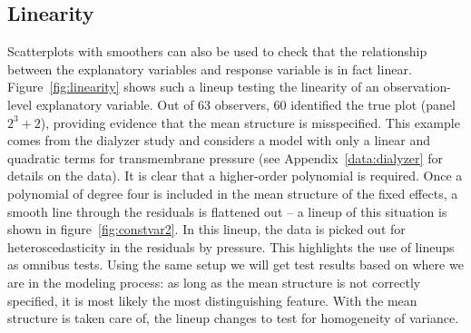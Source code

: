 \documentclass[12pt]{article} %
\newcommand{\alnote}[1]{\todo[inline,color=green!40]{#1}} %
\newcommand{\hhnote}[1]{\todo[inline,color=orange!40]{#1}}
\begin{document}




\subsection{Linearity}

Scatterplots with smoothers can also be used to check that the relationship between the explanatory variables and response variable is in fact linear. Figure~\ref{fig:linearity} shows such a lineup testing the linearity of an observation-level explanatory variable. Out of 63 observers, 60 identified the true plot (panel $2^3 + 2$), providing evidence that the mean structure is misspecified. This example comes from the dialyzer study and considers a model with only a linear and quadratic terms for transmembrane pressure (see Appendix~\ref{data:dialyzer} for details on the data). It is clear that a higher-order polynomial is required. 
Once a polynomial of degree four is included in the mean structure of the fixed effects, a smooth line through the residuals is flattened out -- a lineup of this situation is shown in figure~\ref{fig:constvar2}. In this lineup, the data is picked out for heteroscedasticity in the residuals by pressure.  This highlights the use of lineups as omnibus tests. Using the same setup we will get test results based on where we are in the modeling process: as long as the mean structure is not correctly specified, it is most likely the most distinguishing feature. With the mean structure is taken care of, the lineup changes to test for homogeneity of variance. 
\end{document}

